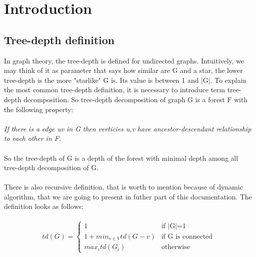\section{Introduction}
\subsection{Tree-depth definition}
In graph theory, the tree-depth is defined for undirected graphs. Intuitively, we may think of it as parameter that says how similar are G and a star, the lower tree-depth is the more "starlike" G is. Its value is between 1 and $|$G$|$. To explain the most common tree-depth definition, it is necessary to introduce term tree-depth decomposition. So tree-depth decomposition of graph G is a forest F with the following property:\\\\
\emph{If there is a edge uv in G then verticies u,v have ancestor-descendant relationship to each other in F.}\\\\
So the tree-depth of G is a depth of the forest with minimal depth among all tree-depth decomposition of G.\\\\
There is also recursive definition, that is worth to mention because of dynamic algorithm, that we are going to present in futher part of this documentation. The definition looks as follows:\\\\
\begin{equation}
td(G) =
\begin{cases}
1 & \text{if $|$G$|$=1}\\
1+min_{v \in V} td(G-v) & \text{if G is connected}\\
max_{i} td(G_{i})  & \text{otherwise}
\end{cases}       
\end{equation}
\\\\
